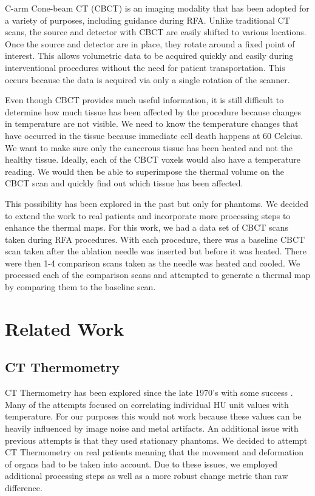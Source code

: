 \documentclass[]{spie}  %
\begin{document}
C-arm Cone-beam CT (CBCT) is an imaging modality that has been adopted for a variety of purposes\cite{Orth08}, including guidance during RFA. Unlike traditional CT scans, the source and detector with CBCT are easily shifted to various locations. Once the source and detector are in place, they rotate around a fixed point of interest. This allows volumetric data to be acquired quickly and easily during interventional procedures without the need for patient transportation. This occurs because the data is acquired via only a single rotation of the scanner.

Even though CBCT provides much useful information, it is still difficult to determine how much tissue has been affected by the procedure because changes in temperature are not visible. We need to know the temperature changes that have occurred in the tissue\cite{Li13} because immediate cell death happens at 60 \degree Celcius. We want to make sure only the cancerous tissue has been heated and not the healthy tissue. Ideally, each of the CBCT voxels would also have a temperature reading. We would then be able to superimpose the thermal volume on the CBCT scan and quickly find out which tissue has been affected.

This possibility has been explored in the past \cite{Li13} but only for phantoms. We decided to extend the work to real patients and incorporate more processing steps to enhance the thermal maps. For this work, we had a data set of CBCT scans taken during RFA procedures. With each procedure, there was a baseline CBCT scan taken after the ablation needle was inserted but before it was heated. There were then 1-4 comparison scans taken as the needle was heated and cooled. We processed each of the comparison scans and attempted to generate a thermal map by comparing them to the baseline scan.

\section{Related Work}

\subsection{CT Thermometry}

CT Thermometry has been explored since the late 1970's with some success \cite{Fani14}. Many of the attempts focused on correlating individual HU unit values with temperature. For our purposes this would not work because these values can be heavily influenced by image noise and metal artifacts. An additional issue with previous attempts is that they used stationary phantoms. We decided to attempt CT Thermometry on real patients meaning that the movement and deformation of organs had to be taken into account. Due to these issues, we employed additional processing steps as well as a more robust change metric than raw difference.
\end{document}
